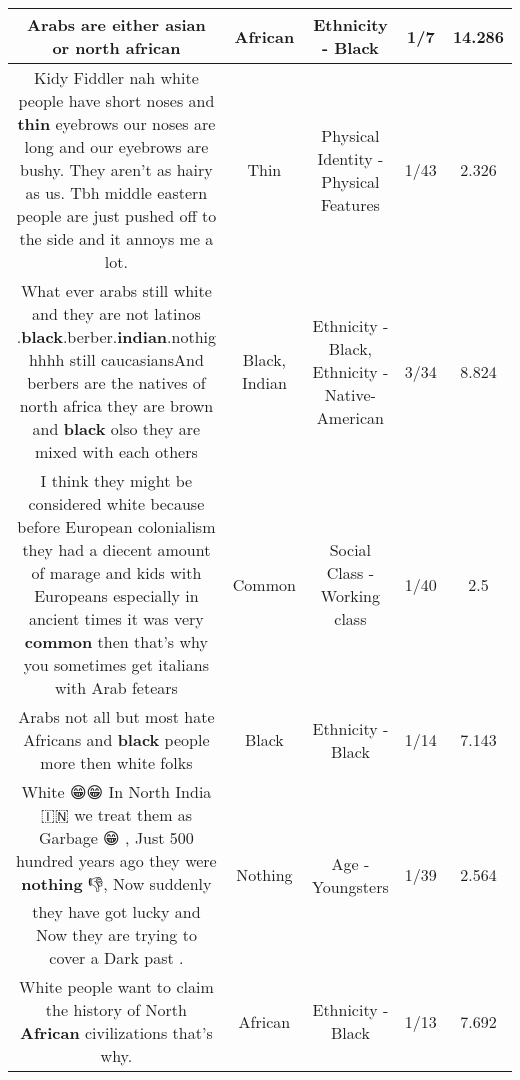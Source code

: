 \documentclass[11pt]{article}
\newlength\mylength
\begin{document}
\begin{center}
\begin{longtable}{|C{.65\mylength}|C{.30\mylength}|C{.12\mylength}|C{.12\mylength}|C{.12\mylength}|}
  \small Arabs are either asian or north african\normalsize   & African & Ethnicity - Black & 1/7 & 14.286 \\  \hline
  \small Kidy Fiddler nah white people have short noses and \textbf{thin} eyebrows our noses are long and our eyebrows are bushy. They aren't as hairy as us. Tbh middle eastern people are just pushed off to the side and it annoys me a lot.\normalsize   & Thin & Physical Identity - Physical Features & 1/43 & 2.326 \\  \hline
  \small What ever arabs still white and they are not latinos .\textbf{black}.berber.\textbf{indian}.nothig hhhh still caucasiansAnd berbers are the natives of north africa they are brown and \textbf{black} olso they are mixed with each others\normalsize   & Black, Indian & Ethnicity - Black, Ethnicity - Native-American & 3/34 & 8.824 \\  \hline
  \small I think they might be considered white because before European colonialism they had a diecent amount of marage and kids with Europeans especially in ancient times it was very \textbf{common} then that's why you sometimes get italians with Arab fetears\normalsize   & Common & Social Class - Working class & 1/40 & 2.5 \\  \hline
  \small Arabs not all but most hate Africans and \textbf{black} people more then white folks\normalsize   & Black & Ethnicity - Black & 1/14 & 7.143 \\  \hline
  \small White 😁😁  In North India 🇮🇳 we treat them as Garbage 😁 , Just 500 hundred years ago they were \textbf{nothing} 👎, Now suddenly they have got lucky and Now they are trying to cover a Dark past  .\normalsize   & Nothing & Age - Youngsters & 1/39 & 2.564 \\  \hline
  \small White people want to claim the history of North \textbf{African} civilizations that's why.\normalsize   & African & Ethnicity - Black & 1/13 & 7.692 \\  \hline

\end{longtable}
\end{center}
\end{document}
